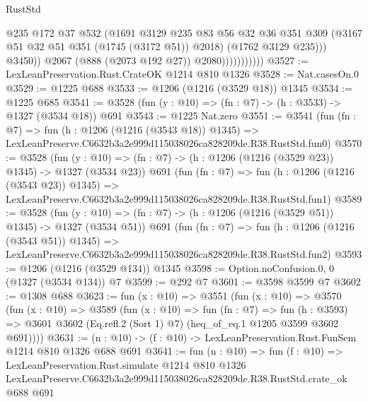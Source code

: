 \begin{lexlean}{RustStd}
\begin{coremodule}
                                @235
                                @172
                                @37
                                @532
                                (@1691
                                  @3129
                                  @235
                                  @83
                                  @56
                                  @32
                                  @36
                                  @351
                                  @309
                                  (@3167 @51 @32 @51 @351 (@1745 (@3172 @51)) @2018)
                                  (@1762 @3129 @235)))
                              @3450))
                          @2067
                          (@888 (@2073 @192 @27))
                          @2080)))))))))))
@3527 := LexLeanPreservation.Rust.CrateOK @1214 @810 @1326
@3528 := Nat.casesOn.{0}
@3529 := @1225 @688
@3533 := @1206 (@1216 (@3529 @18)) @1345
@3534 := @1225 @685
@3541 := @3528 (fun (y : @10) => (fn : @7) -> (h : @3533) -> @1327 (@3534 @18)) @691
@3543 := @1225 Nat.zero
@3551 := @3541
    (fun (fn : @7) =>
    fun (h : @1206 (@1216 (@3543 @18)) @1345) =>
    LexLeanPreserve.C6632b3a2e999d115038026ca828209de.R38.RustStd.fun0)
@3570 := @3528
    (fun (y : @10) => (fn : @7) -> (h : @1206 (@1216 (@3529 @23)) @1345) -> @1327 (@3534 @23))
    @691
    (fun (fn : @7) =>
    fun (h : @1206 (@1216 (@3543 @23)) @1345) =>
    LexLeanPreserve.C6632b3a2e999d115038026ca828209de.R38.RustStd.fun1)
@3589 := @3528
    (fun (y : @10) => (fn : @7) -> (h : @1206 (@1216 (@3529 @51)) @1345) -> @1327 (@3534 @51))
    @691
    (fun (fn : @7) =>
    fun (h : @1206 (@1216 (@3543 @51)) @1345) =>
    LexLeanPreserve.C6632b3a2e999d115038026ca828209de.R38.RustStd.fun2)
@3593 := @1206 (@1216 (@3529 @134)) @1345
@3598 := Option.noConfusion.{0, 0} (@1327 (@3534 @134)) @7
@3599 := @292 @7
@3601 := @3598 @3599 @7
@3602 := @1308 @688
@3623 := fun (x : @10) =>
  @3551
    (fun (x : @10) =>
    @3570
      (fun (x : @10) =>
      @3589
        (fun (x : @10) =>
        fun (fn : @7) =>
        fun (h : @3593) =>
        @3601 @3602 (Eq.refl.{2} (Sort 1) @7) (heq_of_eq.{1} @1205 @3599 @3602 @691))))
@3631 := (n : @10) -> (f : @10) -> LexLeanPreservation.Rust.FunSem @1214 @810 @1326 @688 @691
@3641 := fun (n : @10) =>
  fun (f : @10) =>
  LexLeanPreservation.Rust.simulate
    @1214
    @810
    @1326
    LexLeanPreserve.C6632b3a2e999d115038026ca828209de.R38.RustStd.crate_ok
    @688
    @691
\end{coremodule}
\end{lexlean}

